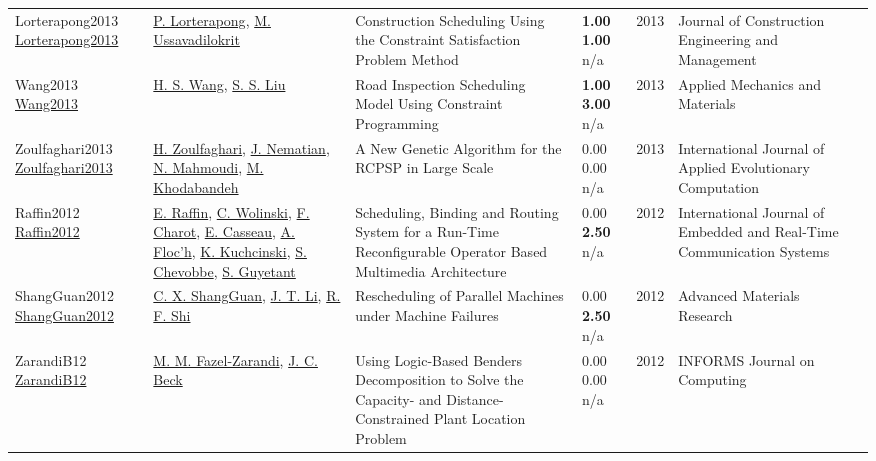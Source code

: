 {\begin{longtable}{p{3cm}p{5cm}p{10cm}p{1cm}rp{2.5cm}l}
Lorterapong2013 \href{http://dx.doi.org/10.1061/(asce)co.1943-7862.0000582}{Lorterapong2013} & \hyperref[auth:a1789]{P. Lorterapong}, \hyperref[auth:a1790]{M. Ussavadilokrit} & Construction Scheduling Using the Constraint Satisfaction Problem Method & \noindent{}\textbf{1.00} \textbf{1.00} n/a & 2013 & Journal of Construction Engineering and Management & \cite{Lorterapong2013}\\
Wang2013 \href{http://dx.doi.org/10.4028/www.scientific.net/amm.357-360.2720}{Wang2013} & \hyperref[auth:a1900]{H. S. Wang}, \hyperref[auth:a1901]{S. S. Liu} & Road Inspection Scheduling Model Using Constraint Programming & \noindent{}\textbf{1.00} \textbf{3.00} n/a & 2013 & Applied Mechanics and Materials & \cite{Wang2013}\\
Zoulfaghari2013 \href{http://dx.doi.org/10.4018/jaec.2013040103}{Zoulfaghari2013} & \hyperref[auth:a1755]{H. Zoulfaghari}, \hyperref[auth:a1756]{J. Nematian}, \hyperref[auth:a1757]{N. Mahmoudi}, \hyperref[auth:a1758]{M. Khodabandeh} & A New Genetic Algorithm for the RCPSP in Large Scale & \noindent{}\textcolor{black!50}{0.00} \textcolor{black!50}{0.00} n/a & 2013 & International Journal of Applied Evolutionary Computation & \cite{Zoulfaghari2013}\\
Raffin2012 \href{http://dx.doi.org/10.4018/jertcs.2012010101}{Raffin2012} & \hyperref[auth:a1529]{E. Raffin}, \hyperref[auth:a658]{C. Wolinski}, \hyperref[auth:a1530]{F. Charot}, \hyperref[auth:a1531]{E. Casseau}, \hyperref[auth:a1532]{A. Floc’h}, \hyperref[auth:a659]{K. Kuchcinski}, \hyperref[auth:a1533]{S. Chevobbe}, \hyperref[auth:a1534]{S. Guyetant} & \cellcolor{green!10}Scheduling, Binding and Routing System for a Run-Time Reconfigurable Operator Based Multimedia Architecture & \noindent{}\textcolor{black!50}{0.00} \textbf{2.50} n/a & 2012 & International Journal of Embedded and Real-Time Communication Systems & \cite{Raffin2012}\\
ShangGuan2012 \href{http://dx.doi.org/10.4028/www.scientific.net/amr.443-444.724}{ShangGuan2012} & \hyperref[auth:a1980]{C. X. ShangGuan}, \hyperref[auth:a1981]{J. T. Li}, \hyperref[auth:a1982]{R. F. Shi} & Rescheduling of Parallel Machines under Machine Failures & \noindent{}\textcolor{black!50}{0.00} \textbf{2.50} n/a & 2012 & Advanced Materials Research & \cite{ShangGuan2012}\\
ZarandiB12 \href{http://dx.doi.org/10.1287/ijoc.1110.0458}{ZarandiB12} & \hyperref[auth:a944]{M. M. Fazel-Zarandi}, \hyperref[auth:a89]{J. C. Beck} & Using Logic-Based Benders Decomposition to Solve the Capacity- and Distance-Constrained Plant Location Problem & \noindent{}\textcolor{black!50}{0.00} \textcolor{black!50}{0.00} n/a & 2012 & \cellcolor{red!20}INFORMS Journal on Computing & \cite{ZarandiB12}\\

\end{longtable}}
